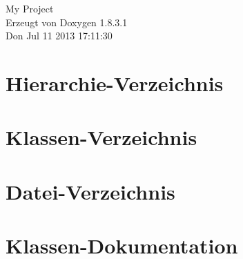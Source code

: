 \documentclass{book}
\begin{document}
\hypersetup{pageanchor=false,citecolor=blue}
\begin{titlepage}
\vspace*{7cm}
\begin{center}
{\Large My Project }\\
\vspace*{1cm}
{\large Erzeugt von Doxygen 1.8.3.1}\\
\vspace*{0.5cm}
{\small Don Jul 11 2013 17:11:30}\\
\end{center}
\end{titlepage}
\clearemptydoublepage
{}
\tableofcontents
\clearemptydoublepage
{}
\hypersetup{pageanchor=true,citecolor=blue}
\chapter{Hierarchie-\/\-Verzeichnis}

\chapter{Klassen-\/\-Verzeichnis}

\chapter{Datei-\/\-Verzeichnis}

\chapter{Klassen-\/\-Dokumentation}
































\end{document}
